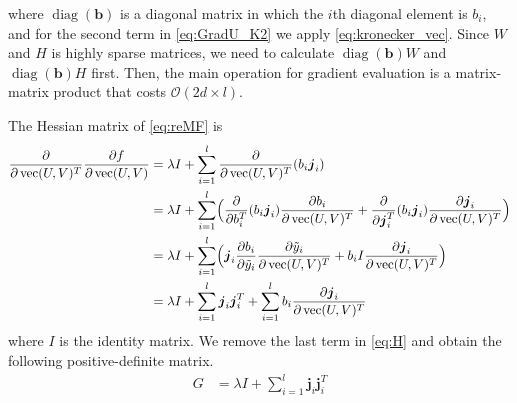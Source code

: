 \documentclass[11pt,twoside]{article}
\newcommand{\bsym}[1]{\ensuremath{\boldsymbol{#1}}}
\newcommand{\bj}{\ensuremath{\bsym{j}}}
\newcommand{\bbO}[1]{\ensuremath{\mathcal{O}\left(#1\right)}}
\DeclareMathOperator*{\diag}{diag}
\DeclareMathOperator*{\vectorize}{vec}
\begin{document}
where $\diag(\bsym{b})$ is a diagonal matrix in which the $i$th diagonal element is $b_i$, and for the second term in \eqref{eq:GradU_K2} we apply \eqref{eq:kronecker_vec}. 
Since $W$ and $H$ is highly sparse matrices, we need to calculate $\diag(\bsym{b})W$ and $\diag(\bsym{b})H$ first.
Then, the main operation for gradient evaluation is a matrix-matrix product that costs $\bbO{2d\times l}$.
\par

The Hessian matrix of \eqref{eq:reMF} is 
\begin{align}
\pdv{\vectorize(U,V)^T} \frac{\partial f}{\partial \vectorize(U,V)}
&=\lambda I + \sum_{i=1}^{l}\pdv{\vectorize(U,V)^T} (b_i \bj_i)\nonumber\\
&=\lambda I + \sum_{i=1}^{l} \Bigl( \pdv{b_i^T} (b_i \bj_i) \frac{\partial b_i}{\partial \vectorize(U,V)^T} + \pdv{\bj_i^T} (b_i \bj_i) \frac{\partial \bj_i}{\partial \vectorize(U,V)^T} \Bigr)\nonumber\\
&=\lambda I + \sum_{i=1}^{l} \Bigl( \bj_i \frac{\partial b_i}{\partial \tilde{y}_i} \frac{\partial \tilde{y}_i}{\partial \vectorize(U,V)^T} + b_i I \frac{\partial \bj_i}{\partial \vectorize(U,V)^T} \Bigr)\nonumber\\
&=\lambda I + \sum_{i=1}^{l} \bj_i \bj_i^T + \sum_{i=1}^{l} b_i \frac{\partial \bj_i}{\partial \vectorize(U,V)^T} 
\label{eq:H}
\end{align}
where $I$ is the identity matrix.
We remove the last term in \eqref{eq:H} and obtain the following positive-definite matrix.
\begin{equation}
    \begin{aligned}
    G &= \lambda I + \sum_{i=1}^{l}\bj_i\bj_i^T
    \label{eq:G}
    \end{aligned}
\end{equation}
\end{document}
